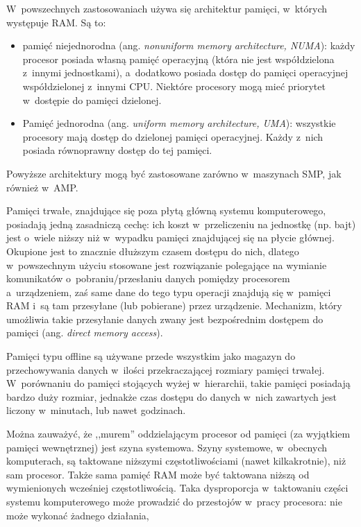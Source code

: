 \documentclass[12pt]{mwart}
\begin{document}
\par
%
\indent
	W~powszechnych zastosowaniach używa się architektur pamięci, w~których występuje RAM. Są to:
	\begin{itemize}
		\item pamięć niejednorodna (ang. \emph{non\dywiz uniform memory architecture, NUMA}): każdy procesor posiada własną pamięć operacyjną
			(która nie jest współdzielona z~innymi jednostkami), a~dodatkowo posiada dostęp do pamięci operacyjnej współdzielonej z~innymi CPU.
			Niektóre procesory mogą mieć priorytet w~dostępie do pamięci dzielonej.
		\item Pamięć jednorodna (ang. \emph{uniform memory architecture, UMA}): wszystkie procesory mają dostęp do dzielonej pamięci operacyjnej.
			Każdy z~nich posiada równoprawny dostęp do tej pamięci.
	\end{itemize}
	Powyższe architektury mogą być zastosowane zarówno w~maszynach SMP, jak również w~AMP.
\par
%
\indent
	Pamięci trwałe, znajdujące się poza płytą główną systemu komputerowego, posiadają jedną zasadniczą cechę: ich koszt w~przeliczeniu na jednostkę
	(np. bajt) jest o~wiele niższy niż w~wypadku pamięci znajdującej się na płycie głównej. Okupione jest to znacznie dłuższym czasem dostępu 
	do nich, dlatego w~powszechnym użyciu stosowane jest rozwiązanie polegające na wymianie komunikatów o~pobraniu/przesłaniu danych pomiędzy
	procesorem a~urządzeniem, zaś same dane do tego typu operacji znajdują się w~pamięci RAM i~są tam przesyłane (lub pobierane) przez urządzenie.
	Mechanizm, który umożliwia takie przesyłanie danych zwany jest bezpośrednim dostępem do pamięci (ang. \emph{direct memory access}).
\par
%
\indent
	Pamięci typu off\dywiz line są używane przede wszystkim jako magazyn do przechowywania danych w~ilości przekraczającej rozmiary pamięci trwałej.
	W~porównaniu do pamięci stojących wyżej w~hierarchii, takie pamięci posiadają bardzo duży rozmiar, jednakże czas dostępu do danych w~nich
	zawartych jest liczony w~minutach, lub nawet godzinach.
\par
%
\indent
	Można zauważyć, że ,,murem'' oddzielającym procesor od pamięci (za wyjątkiem pamięci wewnętrznej) jest szyna systemowa.
	Szyny systemowe, w~obecnych komputerach, są taktowane niższymi częstotliwościami (nawet kilkakrotnie), niż sam procesor.
	Także sama pamięć RAM może być taktowana niższą od wymienionych wcześniej częstotliwością.
	Taka dysproporcja w~taktowaniu części systemu komputerowego może prowadzić do przestojów w~pracy procesora: nie może wykonać żadnego działania,
\end{document}
